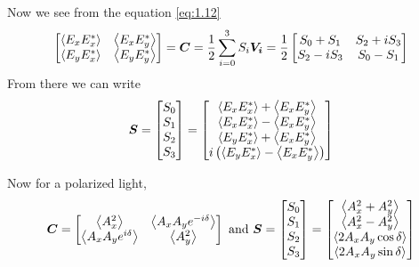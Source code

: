 \documentclass[11pt,a4paper]{article}
\numberwithin{equation}{section}
\begin{document}
Now we see from the equation \ref{eq:1.12}
\begin{align}
	\begin{bmatrix}
		\expval{E_xE_x^\ast} & \expval{E_xE_y^\ast}\\
		\expval{E_yE_x^\ast} & \expval{E_yE_y^\ast}
	\end{bmatrix}=
	\boldsymbol{C} = \frac{1}{2} \sum_{i=0}^{3} S_i \boldsymbol{V_i} = \frac{1}{2}
	\begin{bmatrix}
		S_0+S_1 & S_2+iS_3\\
		S_2-iS_3 & S_0-S_1
	\end{bmatrix}
\end{align}
From there we can write
\begin{align}
	\boldsymbol{S}= \begin{bmatrix} S_0\\ S_1\\ S_2\\S_3\end{bmatrix} =
	\begin{bmatrix}
		\expval{E_xE_x^\ast} + \expval{E_xE_y^\ast}\\
		\expval{E_xE_x^\ast} - \expval{E_xE_y^\ast}\\
		\expval{E_yE_x^\ast} + \expval{E_xE_y^\ast}\\
		i\left(\expval{E_yE_x^\ast} - \expval{E_xE_y^\ast}\right)
	\end{bmatrix} \label{eq:1.15}
\end{align}

Now for a polarized light, 
\begin{align}
	\boldsymbol{C}=
	\begin{bmatrix}
		\expval{A_x^2} & \expval{A_xA_ye^{-i\delta}}\\
		\expval{A_xA_ye^{i\delta}} & \expval{A_y^2}
	\end{bmatrix} \text{ and }
	\boldsymbol{S}= \begin{bmatrix} S_0\\ S_1\\ S_2\\S_3\end{bmatrix} =
	\begin{bmatrix}
		\expval{A_x^2 + A_y^2}\\
		\expval{A_x^2 - A_y^2}\\
		\expval{2A_xA_y\cos\delta}\\
		\expval{2A_xA_y\sin\delta}
	\end{bmatrix} \label{eq:1.16}
\end{align}
\end{document}
